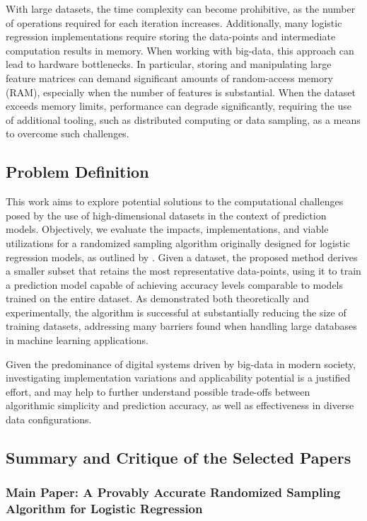 \documentclass{article}
\theoremstyle{plain}
\theoremstyle{definition}
\theoremstyle{remark}
\begin{document}
With large datasets, the time complexity can become prohibitive, as the number of operations required for each iteration increases. Additionally, many logistic regression implementations require storing the data-points and intermediate computation results in memory. When working with big-data, this approach can lead to hardware bottlenecks. In particular, storing and manipulating large feature matrices can demand significant amounts of random-access memory (RAM), especially when the number of features is substantial. When the dataset exceeds memory limits, performance can degrade significantly, requiring the use of additional tooling, such as distributed computing or data sampling, as a means to overcome such challenges.

\subsection{Problem Definition}

This work aims to explore potential solutions to the computational challenges posed by the use of high-dimensional datasets in the context of prediction models. Objectively, we evaluate the impacts, implementations, and viable utilizations for a randomized sampling algorithm originally designed for logistic regression models, as outlined by \citet{chow24}. Given a dataset, the proposed method derives a smaller subset that retains the most representative data-points, using it to train a prediction model capable of achieving accuracy levels comparable to models trained on the entire dataset. As demonstrated both theoretically and experimentally, the algorithm is successful at substantially reducing the size of training datasets, addressing many barriers found when handling large databases in machine learning applications.

Given the predominance of digital systems driven by big-data in modern society, investigating implementation variations and applicability potential is a justified effort, and may help to further understand possible trade-offs between algorithmic simplicity and prediction accuracy, as well as effectiveness in diverse data configurations.


\subsection{Summary and Critique of the Selected Papers}

\subsubsection{Main Paper: A Provably Accurate Randomized Sampling Algorithm for Logistic Regression \cite{chow24}}
\end{document}
